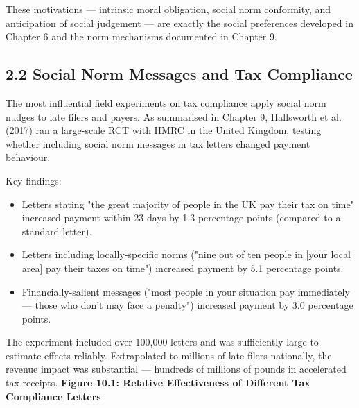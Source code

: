 \documentclass[12pt, letterpaper]{article}
\begin{document}
These motivations --- intrinsic moral obligation, social norm conformity, and anticipation of social judgement --- are exactly the social preferences developed in Chapter 6 and the norm mechanisms documented in Chapter 9.


\subsection{2.2 Social Norm Messages and Tax Compliance}


The most influential field experiments on tax compliance apply social norm nudges to late filers and payers. As summarised in Chapter 9, Hallsworth et al. (2017) ran a large-scale RCT with HMRC in the United Kingdom, testing whether including social norm messages in tax letters changed payment behaviour.

Key findings:
\begin{itemize}
\item Letters stating "the great majority of people in the UK pay their tax on time" increased payment within 23 days by 1.3 percentage points (compared to a standard letter).
\item Letters including locally-specific norms ("nine out of ten people in [your local area] pay their taxes on time") increased payment by 5.1 percentage points.
\item Financially-salient messages ("most people in your situation pay immediately --- those who don't may face a penalty") increased payment by 3.0 percentage points.
\end{itemize}

The experiment included over 100,000 letters and was sufficiently large to estimate effects reliably. Extrapolated to millions of late filers nationally, the revenue impact was substantial --- hundreds of millions of pounds in accelerated tax receipts.
\newpage
\textbf{Figure 10.1: Relative Effectiveness of Different Tax Compliance Letters}
\end{document}
